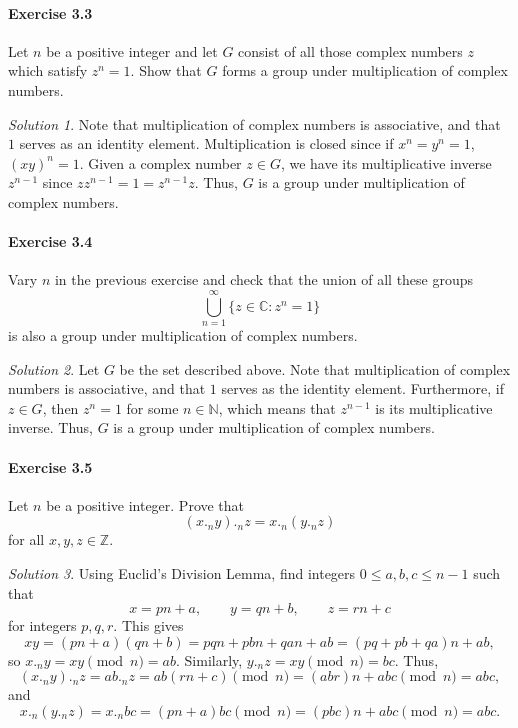 \documentclass[11pt]{report}
\def\C{\mathbb{C}}
\def\Z{\mathbb{Z}}
\def\N{\mathbb{N}}
\theoremstyle{remark}
\newtheorem*{solution}{Solution}
\begin{document}
    \paragraph{Exercise 3.3} Let $n$ be a positive integer and let $G$ consist of
    all those complex numbers $z$ which satisfy $z^n = 1$. Show that $G$ forms a
    group under multiplication of complex numbers.
    \begin{solution}
        Note that multiplication of complex numbers is associative, and that $1$
        serves as an identity element. Multiplication is closed since if $x^n = y^n
        = 1$, $(xy)^n = 1$. Given a complex number $z \in G$, we have its
        multiplicative inverse $z^{n - 1}$ since $zz^{n - 1} = 1 = z^{n - 1}z$.
        Thus, $G$ is a group under multiplication of complex numbers.
    \end{solution}

    \paragraph{Exercise 3.4} Vary $n$ in the previous exercise and check that the
    union of all these groups \[
        \bigcup_{n = 1}^\infty \{z \in \C : z^n = 1\}
    \] is also a group under multiplication of complex numbers.
    \begin{solution}
        Let $G$ be the set described above. Note that multiplication of complex
        numbers is associative, and that $1$ serves as the identity element.
        Furthermore, if $z \in G$, then $z^n = 1$ for some $n \in \N$, which means
        that $z^{n - 1}$ is its multiplicative inverse. Thus, $G$ is a group under
        multiplication of complex numbers.
    \end{solution}

    \paragraph{Exercise 3.5} Let $n$ be a positive integer. Prove that \[
        (x ._{n} y) ._{n} z = x ._{n} (y ._{n} z)
    \] for all $x, y, z \in \Z$.
    \begin{solution}
        Using Euclid's Division Lemma, find integers $0\leq a, b, c \leq n - 1$ such
        that \[
            x = pn + a, \qquad y = qn + b, \qquad z = rn + c
        \] for integers $p, q, r$. This gives \[
            xy = (pn + a)(qn + b) = pqn + pbn + qan + ab = (pq + pb + qa)n + ab,
        \] so $x ._{n} y = xy \pmod{n} = ab$. Similarly, $y._{n}z = xy \pmod{n} =
        bc$. Thus, \[
            (x ._{n} y) ._{n} z = ab ._{n} z = ab (rn + c) \pmod{n} = (abr)n + abc
            \pmod{n} = abc,
        \] and \[
            x ._{n} (y ._{n} z) = x ._{n} bc = (pn + a)bc \pmod{n} = (pbc)n + abc
            \pmod{n} = abc.
        \] 
    \end{solution}
    
\end{document}
